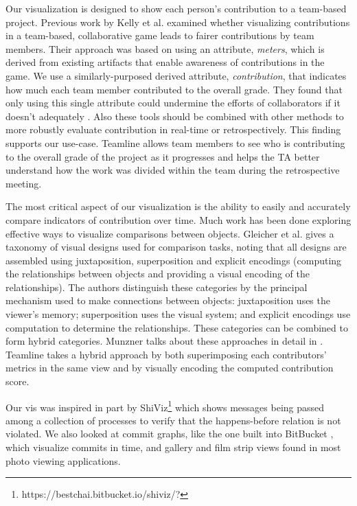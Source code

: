 \documentclass[../manifest.tex]{subfiles}
\begin{document}
Our visualization is designed to show each person's contribution to a team-based project. Previous work by Kelly et al. \cite{Kelly:2016} examined whether visualizing contributions in a team-based, collaborative game leads to fairer contributions by team members. Their approach was based on using an attribute, \textit{meters}, which is derived from existing artifacts that enable awareness of contributions in the game. We use a similarly-purposed derived attribute, \textit{contribution}, that indicates how much each team member contributed to the overall grade. They found that only using this single attribute could undermine the efforts of collaborators if it doesn't adequately  \cite{Kelly:2016}. Also these tools should be combined with other methods to more robustly evaluate contribution in real-time or retrospectively. This finding supports our use-case. Teamline allows team members to see who is contributing to the overall grade of the project as it progresses and helps the TA better understand how the work was divided within the team during the retrospective meeting.

The most critical aspect of our visualization is the ability to easily and accurately compare indicators of contribution over time. Much work has been done exploring effective ways to visualize comparisons between objects. Gleicher et al. \cite{Gleicher:2011} gives a taxonomy of visual designs used for comparison tasks, noting that all designs are assembled using juxtaposition, superposition and explicit encodings (computing the relationships between objects and providing a visual encoding of the relationships). The authors distinguish these categories by the principal mechanism used to make connections between objects: juxtaposition uses the viewer’s memory; superposition uses the visual system; and explicit encodings use computation to determine the relationships. These categories can be combined to form hybrid categories. Munzner talks about these approaches in detail in \cite{Munzner:2014}. Teamline takes a hybrid approach by both superimposing each contributors' metrics in the same view and by visually encoding the computed contribution score.

Our vis was inspired in part by ShiViz\footnote{https://bestchai.bitbucket.io/shiviz/?}\cite{Abrahamson:2014} which shows messages being passed among a collection of processes to verify that the happens-before relation is not violated. We also looked at commit graphs, like the one built into BitBucket \cite{commitgraph}, which visualize commits in time, and gallery and film strip views found in most photo viewing applications.
\end{document}

